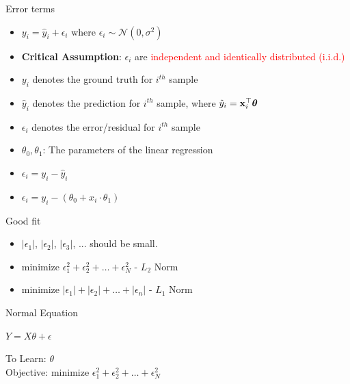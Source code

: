 \documentclass{beamer}
\begin{document}
\begin{frame}{Error terms}


	\begin{itemize}[<+->]
		\item $y_{i} = \hat{y}_{i} + \epsilon_{i}$ where $\epsilon_{i} \sim \mathcal{N}(0, \sigma^2)$
		\item \textbf{Critical Assumption}: $\epsilon_{i}$ are \textcolor{red}{independent and identically distributed (i.i.d.)}
		\item $y_{i}$ denotes the ground truth for $i^{th}$ sample
		\item $\hat{y}_{i}$ denotes the prediction for $i^{th}$ sample, where $\hat{y}_{i} = \mathbf{x}_{i}^\top \boldsymbol{\theta}$
		\item $\epsilon_{i}$ denotes the error/residual for $i^{th}$ sample
		\item $\theta_{0}, \theta_{1}$: The parameters of the linear regression
		\item   $  \epsilon_{i} = y_{i} - \hat{y}_{i}$
		\item     $\epsilon_{i} = y_{i} - (\theta_{0} + x_{i} \cdot \theta_{1})$

\end{itemize}





\end{frame}



\begin{frame}{Good fit}

\begin{itemize}
    \item<+-> $|\epsilon_{1}|$, $|\epsilon_{2}|$, $|\epsilon_{3}|$, ... should be small.
    \item<+-> 
${\text{minimize }} \epsilon_{1}^2 + \epsilon_{2}^2 + \dots + \epsilon_{N}^2$ - $L_{2}$ Norm
    \item<+-> 
${\text{minimize }} |\epsilon_{1}| + |\epsilon_{2}| + \dots + |\epsilon_{n}|$ - $L_{1}$ Norm
\end{itemize}
\end{frame}





\begin{frame}{Normal Equation}
    
    
   \pause  \begin{tcolorbox}
       $ Y = X\theta + \epsilon$
    \end{tcolorbox}
    
    \pause To Learn: $\theta$ \\
    \pause Objective: ${\text{minimize }} \epsilon_{1}^2 + \epsilon_{2}^2 + \dots + \epsilon_{N}^2$  
\end{frame}
\end{document}
